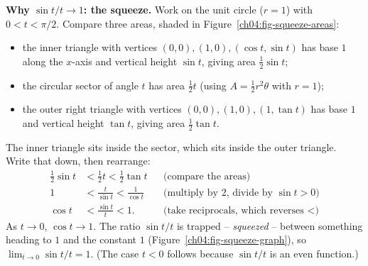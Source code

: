 \begin{focusbox}
\textbf{Why $\sin t / t \to 1$: the squeeze.} Work on the unit circle ($r=1$) with $0 < t < \pi/2$. Compare three areas, shaded in Figure~\ref{ch04:fig-squeeze-areas}:
\begin{itemize}
  \item the inner triangle with vertices $(0,0),(1,0),(\cos t,\sin t)$ has base $1$ along the $x$-axis and vertical height $\sin t$, giving area $\tfrac12\sin t$;
  \item the circular sector of angle $t$ has area $\tfrac12 t$ (using $A=\tfrac12 r^2\theta$ with $r=1$);
  \item the outer right triangle with vertices $(0,0),(1,0),(1,\tan t)$ has base $1$ and vertical height $\tan t$, giving area $\tfrac12\tan t$.
\end{itemize}
The inner triangle sits inside the sector, which sits inside the outer triangle. Write that down, then rearrange:
\begin{align*}
  \tfrac12 \sin t &< \tfrac12 t < \tfrac12 \tan t
    &&\text{(compare the areas)}\\
  1 &< \frac{t}{\sin t} < \frac{1}{\cos t}
    &&\text{(multiply by $2$, divide by $\sin t > 0$)}\\
  \cos t &< \frac{\sin t}{t} < 1.
    &&\text{(take reciprocals, which reverses ${<}$)}
\end{align*}
As $t\to 0$, $\cos t \to 1$. The ratio $\sin t/t$ is trapped -- \emph{squeezed} -- between something heading to $1$ and the constant $1$ (Figure~\ref{ch04:fig-squeeze-graph}), so $\lim_{t\to 0}\sin t/t = 1$. (The case $t<0$ follows because $\sin t/t$ is an even function.)
\end{focusbox}

